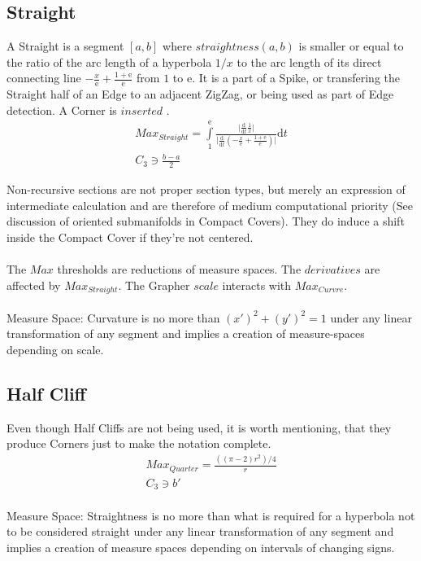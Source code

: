 \documentclass{report}
\begin{document}
\subsection{Straight}
A Straight is a segment $[a,b]$ where $straightness(a,b)$ is smaller or equal to the ratio of the arc length of a hyperbola $1/x$ to the arc length of its direct connecting line $-\frac{x}{\mathrm{e}}+\frac{1+\mathrm{e}}{\mathrm{e}}$ from $1$ to $\mathrm{e}$. It is a part of a Spike, or transfering the Straight half of an Edge to an adjacent ZigZag, or being used as part of Edge detection. A Corner is $inserted$ .
\begin{align}
Max_{Straight}=\int \limits _{1}^{\mathrm{e}}\frac{\lvert\frac{\mathrm{d}}{\mathrm{d}t}\frac{1}{x}\rvert}{\lvert\frac{\mathrm{d}}{\mathrm{d}t}(-\frac{x}{\mathrm{e}}+\frac{1+\mathrm{e}}{\mathrm{e}})\rvert}\mathrm{d}t\\
C_{3} \ni \frac{b-a}{2}
\end{align}

Non-recursive sections are not proper section types, but merely an expression of intermediate calculation and are therefore of medium computational priority (See discussion of oriented submanifolds in Compact Covers). They do induce a shift inside the Compact Cover if they're not centered.\\\\
The $Max$ thresholds are reductions of measure spaces. The $derivatives$ are affected by $Max_{Straight}$. The Grapher $scale$ interacts with $Max_{Curvre}.$\\\\
Measure Space: Curvature is no more than $(x')^2 + (y')^2 =1$  under any linear transformation of any segment and implies a creation of measure-spaces depending on scale.
\subsection*{Half Cliff}
Even though Half Cliffs are not being used, it is worth mentioning, that they produce Corners just to make the notation complete.
\begin{align}
Max_{Quarter}=\frac{((\pi-2) r^2) /4}{r}\\
C_{3} \ni b'
\end{align}\\
Measure Space: Straightness is no more than what is required for a hyperbola not to be considered straight under any linear transformation of any segment and implies a creation of measure spaces depending on intervals of changing signs.\\\\
\end{document}
